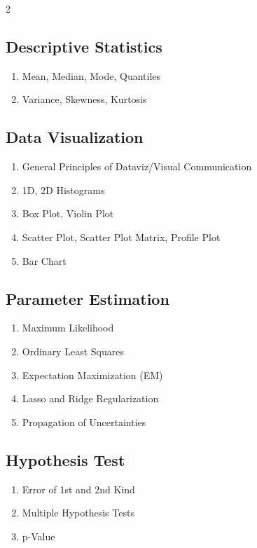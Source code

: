 \documentclass[8pt]{extarticle}
\begin{document}
\begin{multicols}{2}
    \subsection{Descriptive Statistics}
    \begin{enumerate}[label*=\arabic*.]
        \item Mean, Median, Mode, Quantiles
        \item Variance, Skewness, Kurtosis
    \end{enumerate}
    \subsection{Data Visualization}
    \begin{enumerate}[label*=\arabic*.]
        \item General Principles of Dataviz/Visual Communication
        \item 1D, 2D Histograms
        \item Box Plot, Violin Plot
        \item Scatter Plot, Scatter Plot Matrix, Profile Plot
        \item Bar Chart
    \end{enumerate}
    \subsection{Parameter Estimation}
    \begin{enumerate}[label*=\arabic*.]
        \item Maximum Likelihood
        \item Ordinary Least Squares
        \item Expectation Maximization (EM)
        \item Lasso and Ridge Regularization
        \item Propagation of Uncertainties
    \end{enumerate}
    \subsection{Hypothesis Test}
    \begin{enumerate}[label*=\arabic*.]
        \item Error of 1st and 2nd Kind
        \item Multiple Hypothesis Tests
        \item p-Value
    \end{enumerate}


\end{multicols}
\end{document}
